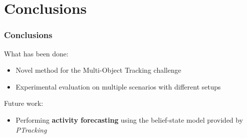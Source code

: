 \section{Conclusions}

\begin{frame}
	\frametitle{Conclusions}
	
	What has been done:
	
	\begin{itemize}
		\item Novel method for the Multi-Object Tracking challenge
		\item Experimental evaluation on multiple scenarios with different setups
	\end{itemize}
	
	\vspace{0.5cm}
	
	Future work:
	
	\begin{itemize}
		\item Performing \textbf{activity forecasting} using the belief-state model provided by \emph{PTracking}
	\end{itemize}
\end{frame}
